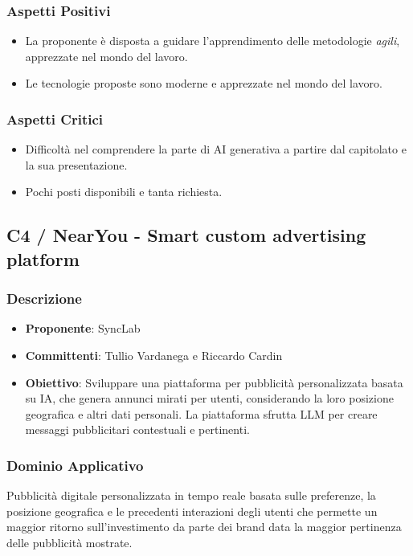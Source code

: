 \documentclass[a4paper, 12pt]{article}
\begin{document}
\subsubsection{Aspetti Positivi}
\begin{itemize}
    \item La proponente è disposta a guidare l’apprendimento delle metodologie \textit{agili}, apprezzate nel mondo del lavoro.
    \item Le tecnologie proposte sono moderne e apprezzate nel mondo del lavoro.
\end{itemize}

\subsubsection{Aspetti Critici}
\begin{itemize}
    \item Difficoltà nel comprendere la parte di AI generativa a partire dal capitolato e la sua presentazione.
    \item Pochi posti disponibili e tanta richiesta.
\end{itemize}

\subsection{C4 / NearYou - Smart custom advertising platform}
\subsubsection{Descrizione}
\begin{itemize}
    \item \textbf{Proponente}: SyncLab 
    \item \textbf{Committenti}: Tullio Vardanega e Riccardo Cardin
    \item \textbf{Obiettivo}: Sviluppare una piattaforma per pubblicità personalizzata basata su IA, che genera annunci mirati per utenti, considerando la loro posizione geografica e altri dati personali. La piattaforma sfrutta LLM per creare messaggi pubblicitari contestuali e pertinenti.
\end{itemize}

\subsubsection{Dominio Applicativo}
Pubblicità digitale personalizzata in tempo reale basata sulle preferenze, la posizione geografica e le precedenti interazioni degli utenti che permette un maggior ritorno sull’investimento da parte dei brand data la maggior pertinenza delle pubblicità mostrate.
\end{document}
